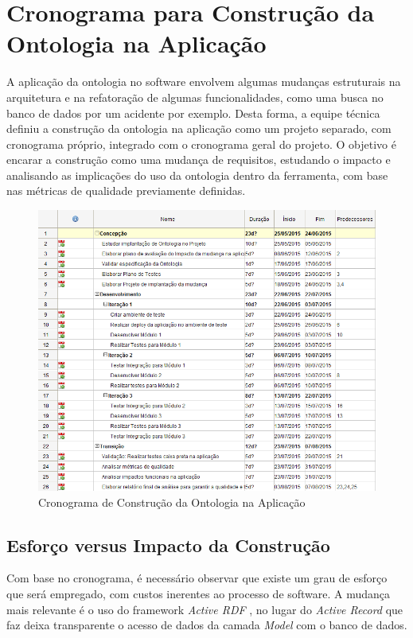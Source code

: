 \section{Cronograma para Construção da Ontologia na Aplicação}

A aplicação da ontologia no software envolvem algumas mudanças estruturais na arquitetura e
na refatoração de algumas funcionalidades, como uma busca no banco de dados por um acidente por 
exemplo. Desta forma, a equipe técnica definiu a construção da ontologia na aplicação como um projeto
separado, com cronograma próprio, integrado com o cronograma geral do projeto.
O objetivo é encarar a construção como uma mudança de requisitos, estudando o impacto e analisando
as implicações do uso da ontologia dentro da ferramenta, com base nas métricas de qualidade previamente 
definidas. 

\begin{figure}[h]
	\centering
	\includegraphics[scale=0.9]{Figuras/cronograma_construcao_ontologia.png}
	\caption{Cronograma de Construção da Ontologia na Aplicação}
\end{figure}

\pagebreak

\subsection{Esforço versus Impacto da Construção}

Com base no cronograma, é necessário observar que existe um grau de esforço que será empregado,
com custos inerentes ao processo de software. A mudança mais relevante é o uso do framework \textit{Active RDF} \footnotemark[1], no lugar do \textit{Active Record} que faz deixa transparente o acesso de dados da camada \textit{Model} com o banco de dados. 


